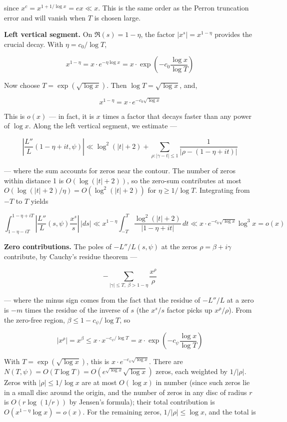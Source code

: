 \documentclass[12pt,a4paper]{article}
\begin{document}
since $x^c = x^{1+1/\log x} = ex \ll x$. This is the same order as the Perron truncation error and will vanish when $T$ is chosen large.

\textbf{Left vertical segment.} On $\Re(s) = 1-\eta$, the factor $|x^s| = x^{1-\eta}$ provides the crucial decay. With $\eta = c_0/\log T$,

\[
x^{1-\eta} = x \cdot e^{-\eta \log x} = x \cdot \exp\!\left(-c_0 \frac{\log x}{\log T}\right)
\]

Now choose $T = \exp(\sqrt{\log x})$. Then $\log T = \sqrt{\log x}$, and,

\[
x^{1-\eta} = x \cdot e^{-c_0 \sqrt{\log x}}
\]

This is $o(x)$ --- in fact, it is $x$ times a factor that decays faster than any power of $\log x$. Along the left vertical segment, we estimate ---

\[
\left| \frac{L''}{L}(1-\eta+it, \psi) \right| \ll \log^2(|t|+2) + \sum_{\rho: |\gamma-t| \leq 1} \frac{1}{|\rho - (1-\eta+it)|}
\]

--- where the sum accounts for zeros near the contour. The number of zeros within distance 1 is $O(\log(|t|+2))$, so the zero-sum contributes at most $O(\log(|t|+2)/\eta) = O(\log^2(|t|+2))$ for $\eta \geq 1/\log T$. Integrating from $-T$ to $T$ yields

\[
\int_{1-\eta-iT}^{1-\eta+iT} \left| \frac{L''}{L}(s, \psi) \frac{x^s}{s} \right| \, |ds| \ll x^{1-\eta} \int_{-T}^T \frac{\log^2(|t|+2)}{|1-\eta+it|} \, dt \ll x \cdot e^{-c_0\sqrt{\log x}} \log^3 x = o(x)
\]

\textbf{Zero contributions.} The poles of $-L''/L(s, \psi)$ at the zeros $\rho = \beta + i\gamma$ contribute, by Cauchy's residue theorem ---

\[
-\sum_{|\gamma| \leq T, \; \beta > 1-\eta} \frac{x^\rho}{\rho}
\]

--- where the minus sign comes from the fact that the residue of $-L''/L$ at a zero is $-m$ times the residue of the inverse of $s$ (the $x^s/s$ factor picks up $x^\rho/\rho$). From the zero-free region, $\beta \leq 1 - c_{\psi}/\log T$, so

\[
|x^\rho| = x^\beta \leq x \cdot x^{-c_{\psi}/\log T} = x \cdot \exp\!\left(-c_{\psi} \frac{\log x}{\log T}\right)
\]

With $T = \exp(\sqrt{\log x})$, this is $x \cdot e^{-c_{\psi} \sqrt{\log x}}$. There are $N(T, \psi) = O(T \log T) = O(e^{\sqrt{\log x}} \sqrt{\log x})$ zeros, each weighted by $1/|\rho|$. Zeros with $|\rho| \leq 1/\log x$ are at most $O(\log x)$ in number (since such zeros lie in a small disc around the origin, and the number of zeros in any disc of radius $r$ is $O(r \log(1/r))$ by Jensen's formula); their total contribution is $O(x^{1-\eta} \log x) = o(x)$. For the remaining zeros, $1/|\rho| \leq \log x$, and the total is
\end{document}
